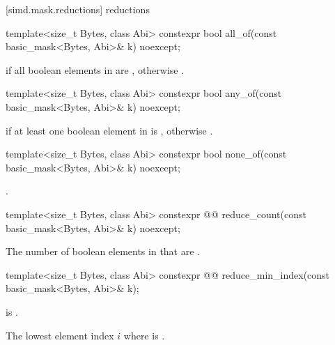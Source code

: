 [simd.mask.reductions]{ reductions}

\begin{itemdecl}
template<size_t Bytes, class Abi>
  constexpr bool all_of(const basic_mask<Bytes, Abi>& k) noexcept;
\end{itemdecl}

\begin{itemdescr}
\pnum
\returns
{} if all boolean elements in  are , otherwise
.
\end{itemdescr}

\begin{itemdecl}
template<size_t Bytes, class Abi>
  constexpr bool any_of(const basic_mask<Bytes, Abi>& k) noexcept;
\end{itemdecl}

\begin{itemdescr}
\pnum
\returns
{} if at least one boolean element in  is ,
otherwise .
\end{itemdescr}

\begin{itemdecl}
template<size_t Bytes, class Abi>
  constexpr bool none_of(const basic_mask<Bytes, Abi>& k) noexcept;
\end{itemdecl}

\begin{itemdescr}
\pnum
\returns
{}.
\end{itemdescr}

\begin{itemdecl}
template<size_t Bytes, class Abi>
  constexpr @@ reduce_count(const basic_mask<Bytes, Abi>& k) noexcept;
\end{itemdecl}

\begin{itemdescr}
\pnum
\returns
The number of boolean elements in  that are .
\end{itemdescr}

\begin{itemdecl}
template<size_t Bytes, class Abi>
  constexpr @@ reduce_min_index(const basic_mask<Bytes, Abi>& k);
\end{itemdecl}

\begin{itemdescr}
\pnum
\expects
{} is .

\pnum
\returns
The lowest element index $i$ where  is .
\end{itemdescr}

